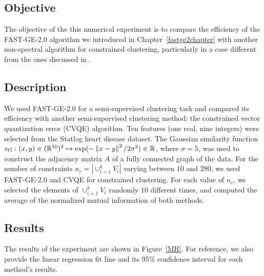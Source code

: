 \subsection*{Objective}
The objective of the this numerical experiment is to compare the efficiency of the FAST-GE-2.0 algorithm we introduced in Chapter~\ref{fastge2chapter} with another non-spectral algorithm for constrained clustering, particularly in a case different from the ones discussed in \cite{fastge2}.
\subsection*{Description}
We used FAST-GE-2.0 for a semi-supervised clustering task and compared its efficiency with another semi-supervised clustering method: the constrained vector quantization error (CVQE) algorithm.
Ten features (one real, nine integers) were selected from the Statlog heart disease dataset.
The Gaussian similarity function $s_G: (x,y) \in (\mathbb R^{10})^2 \mapsto \exp ( - \left\lVert x-y\right\rVert^2/2 \sigma ^2) \in \mathbb R$, where $\sigma = 5$, was used to construct the adjacency matrix $A$ of a fully connected graph of the data.
For the number of constraints $n_c = \left| \cup_{i=1}^k V_i \right|$ varying between $10$ and $280$, we used FAST-GE-2.0 and CVQE for constrained clustering.
For each value of $n_c$, we selected the elements of $\cup_{i=1}^k V_i$ randomly $10$ different times, and computed the average of the normalized mutual information of both methods.

\subsection*{Results}
The results of the experiment are shown in Figure~\vref{MR}.
For reference, we also provide the linear regression fit line and its 95\% confidence interval for each method's results.

